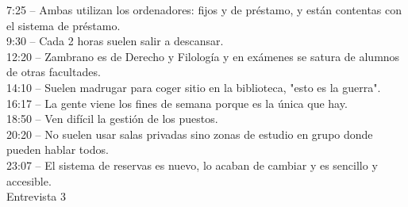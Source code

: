 \documentclass[12pt]{article}
\begin{document}
7:25 – Ambas utilizan los ordenadores: fijos y de préstamo, y están contentas con el sistema de préstamo.\\
9:30 – Cada 2 horas suelen salir a descansar.\\
12:20 – Zambrano es de Derecho y Filología y en exámenes se satura de alumnos de otras facultades.\\
14:10 – Suelen madrugar para coger sitio en la biblioteca, "esto es la guerra".\\
16:17 – La gente viene los fines de semana porque es la única que hay.\\
18:50 – Ven difícil la gestión de los puestos.\\
20:20 – No suelen usar salas privadas sino zonas de estudio en grupo donde pueden hablar todos.\\ 
23:07 – El sistema de reservas es nuevo, lo acaban de cambiar y es sencillo y accesible.\\

Entrevista 3
\end{document}
